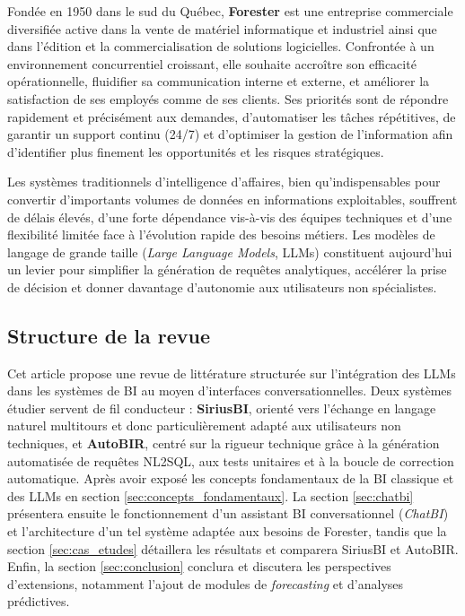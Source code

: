 \documentclass[conference]{IEEEtran}
\begin{document}
Fondée en 1950 dans le sud du Québec, \textbf{Forester} est une entreprise commerciale diversifiée active dans la vente de matériel informatique et industriel ainsi que dans l’édition et la commercialisation de solutions logicielles. Confrontée à un environnement concurrentiel croissant, elle souhaite accroître son efficacité opérationnelle, fluidifier sa communication interne et externe, et améliorer la satisfaction de ses employés comme de ses clients. Ses priorités sont de répondre rapidement et précisément aux demandes, d’automatiser les tâches répétitives, de garantir un support continu (24/7) et d’optimiser la gestion de l’information afin d’identifier plus finement les opportunités et les risques stratégiques.

Les systèmes traditionnels d’intelligence d’affaires, bien qu’indispensables pour convertir d’importants volumes de données en informations exploitables, souffrent de délais élevés, d’une forte dépendance vis-à-vis des équipes techniques et d’une flexibilité limitée face à l’évolution rapide des besoins métiers. Les modèles de langage de grande taille (\textit{Large Language Models}, LLMs) constituent aujourd’hui un levier pour simplifier la génération de requêtes analytiques, accélérer la prise de décision et donner davantage d’autonomie aux utilisateurs non spécialistes.

\subsection{Structure de la revue}  
Cet article propose une revue de littérature structurée sur l’intégration des LLMs dans les systèmes de BI au moyen d’interfaces conversationnelles. Deux systèmes étudier servent de fil conducteur : \textbf{SiriusBI}, orienté vers l’échange en langage naturel multitours et donc particulièrement adapté aux utilisateurs non techniques, et \textbf{AutoBIR}, centré sur la rigueur technique grâce à la génération automatisée de requêtes NL2SQL, aux tests unitaires et à la boucle de correction automatique. Après avoir exposé les concepts fondamentaux de la BI classique et des LLMs en section \ref{sec:concepts_fondamentaux}. La section \ref{sec:chatbi} présentera ensuite le fonctionnement d'un assistant BI conversationnel (\emph{ChatBI}) et l'architecture d'un tel système adaptée aux besoins de Forester, tandis que la section \ref{sec:cas_etudes} détaillera les résultats et comparera SiriusBI et AutoBIR. Enfin, la section \ref{sec:conclusion} conclura et discutera les perspectives d’extensions, notamment l’ajout de modules de \textit{forecasting} et d’analyses prédictives.
\end{document}
